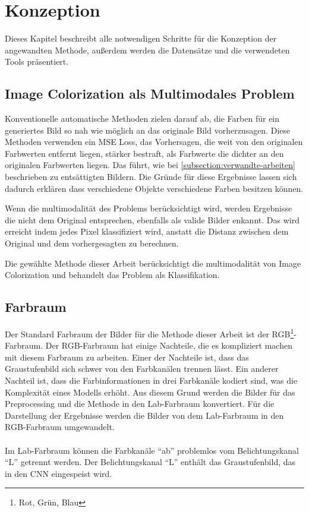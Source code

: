\chapter{Konzeption}
Dieses Kapitel beschreibt alle notwendigen Schritte für die Konzeption der angewandten Methode, außerdem werden die Datensätze
und die verwendeten Tools präsentiert.

\section{Image Colorization als Multimodales Problem}
Konventionelle automatische Methoden zielen darauf ab, die Farben für ein generiertes Bild so nah wie möglich an das originale Bild vorherzusagen.
Diese Methoden verwenden ein MSE Loss, das Vorhersagen, die weit von den originalen Farbwerten entfernt liegen, stärker bestraft, als Farbwerte
die dichter an den originalen Farbwerten liegen. Das führt, wie bei \ref{subsection:verwandte-arbeiten} beschrieben zu entsättigten Bildern.
Die Gründe für diese Ergebnisse lassen sich dadurch erklären dass verschiedene Objekte verschiedene Farben besitzen können. 

Wenn die multimodalität des Problems berücksichtigt wird, werden Ergebnisse die nicht dem Original entsprechen, ebenfalls als valide Bilder
enkannt. Das wird erreicht indem jedes Pixel klassifiziert wird, anstatt die Distanz zwischen dem Original und dem vorhergesagten zu berechnen.

Die gewählte Methode dieser Arbeit berücksichtigt die multimodalität von Image Colorization und behandelt das Problem als Klassifikation.

\section{Farbraum}
Der Standard Farbraum der Bilder für die Methode dieser Arbeit ist der RGB\footnote{Rot, Grün, Blau}-Farbraum. 
Der RGB-Farbraum hat einige Nachteile, die es kompliziert
machen mit diesem Farbraum zu arbeiten. Einer der Nachteile ist, dass das Graustufenbild sich schwer von den Farbkanälen trennen lässt. Ein anderer
Nachteil ist, dass die Farbinformationen in drei Farbkanäle kodiert sind, was die Komplexität eines Modells erhöht. Aus diesem Grund
werden die Bilder für das Preprocessing und die Methode in den Lab-Farbraum konvertiert. Für die Darstellung der Ergebnisse werden die Bilder
von dem Lab-Farbraum in den RGB-Farbraum umgewandelt.
\\
\\
Im Lab-Farbraum können die Farbkanäle ``ab'' problemlos vom Belichtungskanal ``L'' getrennt werden. Der Belichtungskanal ``L'' 
enthält das Graustufenbild, das in den CNN eingespeist wird.

